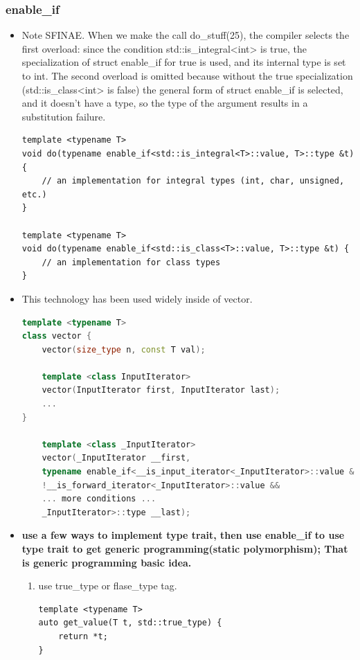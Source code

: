 \documentclass[a4paper,11pt,twoside]{book}
\begin{document}
\subsubsection{enable\_if}
\begin{itemize}
	
	\item Note SFINAE. When we make the call do\_stuff(25), the compiler selects the first overload: since the condition std::is\_integral<int> is true, the specialization of struct enable\_if for true is used, and its internal type is set to int. The second overload is omitted because without the true specialization (std::is\_class<int> is false) the general form of struct enable\_if is selected, and it doesn't have a type, so the type of the argument results in a substitution failure.
	
\begin{lstlisting}[numbers=none]
template <typename T>
void do(typename enable_if<std::is_integral<T>::value, T>::type &t){
	// an implementation for integral types (int, char, unsigned, etc.)
}
	
template <typename T>
void do(typename enable_if<std::is_class<T>::value, T>::type &t) {
	// an implementation for class types
}
\end{lstlisting}
	
	\item This technology has been used widely inside of vector.
\begin{lstlisting}[frame=single, language=c++]
template <typename T>
class vector {
	vector(size_type n, const T val);
	
	template <class InputIterator>
	vector(InputIterator first, InputIterator last);
	...
}
	
	template <class _InputIterator>
	vector(_InputIterator __first,
	typename enable_if<__is_input_iterator<_InputIterator>::value &&
	!__is_forward_iterator<_InputIterator>::value &&
	... more conditions ...
	_InputIterator>::type __last);
\end{lstlisting}
	

	\item \textbf{use a few ways to implement type trait, then use enable\_if to use type trait to get generic programming(static polymorphism); That is generic programming basic idea.}


\begin{enumerate}
	\item use true\_type or flase\_type tag.
\begin{lstlisting}[numbers=none]
template <typename T>
auto get_value(T t, std::true_type) {
	return *t;
}


\end{lstlisting}
\end{enumerate}
\end{itemize}
\end{document}
